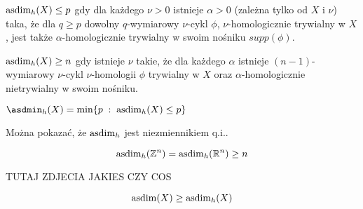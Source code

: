\begin{definition}{}{}
  $\operatorname{asdim}_h(X)\leq p$ gdy dla każdego $\nu>0$ istnieje $\alpha>0$ (zależna tylko od $X$ i $\nu$) taka, że dla $q\geq p$ dowolny $q$-wymiarowy $\nu$-cykl $\phi$, $\nu$-homologicznie trywialny w $X$, jest także $\alpha$-homologicznie trywialny w swoim nośniku $supp(\phi)$.

  $\operatorname{asdim}_h(X)\geq n$ gdy istnieje $\nu$ takie, że dla każdego $\alpha$ istnieje $(n-1)$-wymiarowy $\nu$-cykl $\nu$-homologii $\phi$ trywialny w $X$ oraz $\alpha$-homologicznie nietrywialny w swoim nośniku.

  $\asdmin_h(X)=\min \{p\;:\;\asdim_h(X)\leq p\}$
\end{definition}

Można pokazać, że $\operatorname{asdim}_h$ jest niezmiennikiem q.i..



\begin{theorem}{}{}
  $$\operatorname{asdim}_h(\mathbb{Z}^n)=\operatorname{asdim}_h(\mathbb{R}^n)\geq n$$
\end{theorem}

{\large\color{red}TUTAJ ZDJECIA JAKIES CZY COS}

\begin{theorem}{}{}
  $$\operatorname{asdim}(X)\geq\operatorname{asdim}_h(X)$$
\end{theorem}





